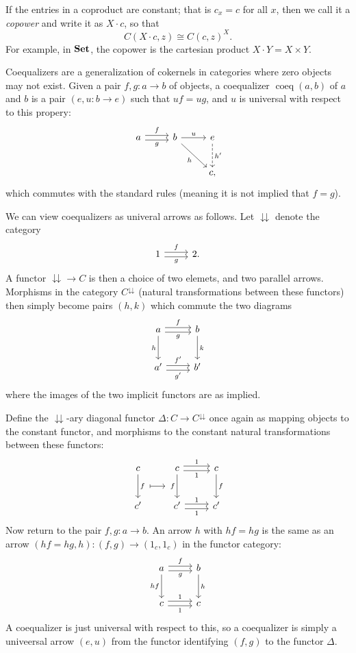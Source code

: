 If the entries in a coproduct are constant; that is $c_x=c$ for all $x$, then we call it a \emph{copower} and write it as $X\cdot c$, so that
\[
	C(X\cdot c,z)\cong C(c,z)^X
.\]
For example, in $\mathbf{Set} $, the copower is the cartesian product $X\cdot Y=X\times Y$.

Coequalizers are a generalization of cokernels in categories where zero objects may not exist. Given a pair $f,g : a \to b$ of objects, a coequalizer $\operatorname{coeq} (a,b)$ of $a$ and $b$ is a pair $(e,u : b \to e)$ such that $uf=ug$, and $u$ is universal with respect to this propery:
\[\begin{tikzcd}[row sep = 2.5em, column sep = 2.5em]
a\ar[" f ", shift left, r] \ar[" g "', shift right, r]  & b \ar[" u ", r] \ar[" h "', dr]  & e\ar[" h' ", dashed, d]  \\
 &  & c,
\end{tikzcd}\]
which commutes with the standard rules (meaning it is not implied that $f=g$).

We can view coequalizers as univeral arrows as follows. Let $\downdownarrows$ denote the category
\[\begin{tikzcd}[row sep = 2.5em, column sep = 2.5em]
1\ar[" f ", shift left, r] \ar[" g "', shift right, r]  & 2.
\end{tikzcd}\]
A functor $\downdownarrows \to C$ is then a choice of two elemets, and two parallel arrows. Morphisms in the category $C^{\downdownarrows} $ (natural transformations between these functors) then simply become pairs $(h,k)$ which commute the two diagrams
\[\begin{tikzcd}[row sep = 2.5em, column sep = 2.5em]
a\ar[" f ", shift left, r] \ar[" g "', shift right, r] \ar[" h "', d]  & b \ar[" k ", d]  \\
a'\ar[" f' ", shift left, r] \ar[" g' "', shift right, r]  & b'
\end{tikzcd}\]
where the images of the two implicit functors are as implied.

Define the $\downdownarrows$-ary diagonal functor $\Delta : C \to C^{\downdownarrows} $ once again as mapping objects to the constant functor, and morphisms to the constant natural transformations between these functors:
\[\begin{tikzcd}[row sep = 2.5em, column sep = 2.5em]
	c\ar[" f "{name=fo}, d]  & c\ar[" 1 ", shift left, r] \ar[" 1 "', shift right, r] \ar[" f "'{name=lo}, d]  & c\ar[" f ", d]  \\
c' & c'\ar[" 1 ", shift left, r] \ar[" 1 "', shift right, r]  & c'
\arrow[from=fo, to=lo, shorten=3pt, mapsto]
\end{tikzcd}\]
Now return to the pair $f,g : a \to b$. An arrow $h$ with $hf=hg$ is the same as an arrow $(hf=hg,h): (f,g) \to (1_c,1_c)$ in the functor category:
\[\begin{tikzcd}[row sep = 2.5em, column sep = 2.5em]
a\ar[" f ", shift left, r] \ar[" g "', shift right, r] \ar[" hf "', d]  & b \ar[" h ", d]  \\
c\ar[" 1 ", shift left, r] \ar[" 1 "', shift right, r]  & c
\end{tikzcd}\]
A coequalizer is just universal with respect to this, so a coequalizer is simply a univeersal arrow $(e,u)$ from the functor identifying $(f,g)$ to the functor $\Delta $.

